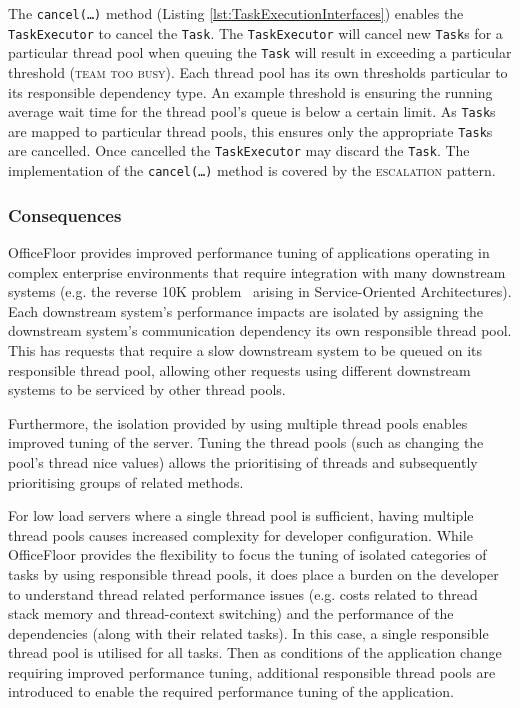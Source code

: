 \documentclass[prodmode]{style/acmlarge}
\begin{document}
The \texttt{cancel(\ldots)} method (Listing \ref{lst:TaskExecutionInterfaces})
enables the \texttt{TaskExecutor} to cancel the \texttt{Task}. The
\texttt{Task\-Executor} will cancel new \texttt{Task}s for a particular thread
pool when queuing the \texttt{Task} will result in exceeding a particular
threshold (\textsc{team too busy}).  Each thread pool has its own thresholds
particular to its responsible dependency type.  An example threshold is ensuring
the running average wait time for the thread pool's queue is below a certain
limit.  As \texttt{Task}s are mapped to particular thread pools, this ensures
only the appropriate \texttt{Task}s are cancelled.  Once cancelled the
\texttt{TaskExecutor} may discard the \texttt{Task}.  The implementation of the
\texttt{can\-cel(\ldots)} method is covered by the \textsc{escalation} pattern.


\subsubsection*{Consequences}

OfficeFloor provides improved performance tuning of applications operating in
complex enterprise environments that require integration with many downstream
systems (e.g. the reverse 10K problem~\cite{reverse-ten-k-problem} arising in
Service-Oriented Architectures).  Each downstream system's performance impacts
are isolated by assigning the downstream system's communication dependency its
own responsible thread pool.  This has requests that require a slow downstream
system to be queued on its responsible thread pool, allowing other requests
using different downstream systems to be serviced by other thread pools.

Furthermore, the isolation provided by using multiple thread pools enables
improved tuning of the server.  Tuning the thread pools (such as changing the
pool's thread nice values) allows the prioritising of threads and subsequently
prioritising groups of related methods.

For low load servers where a single thread pool is sufficient, having multiple
thread pools causes increased complexity for developer configuration.  While
OfficeFloor provides the flexibility to focus the tuning of isolated categories
of tasks by using responsible thread pools, it does place a burden on the
developer to understand thread related performance issues (e.g. costs related to
thread stack memory and thread-context switching) and the performance of the
dependencies (along with their related tasks).  In this case, a single
responsible thread pool is utilised for all tasks.  Then as conditions of the
application change requiring improved performance tuning, additional responsible
thread pools are introduced to enable the required performance tuning of the
application.
\end{document}
